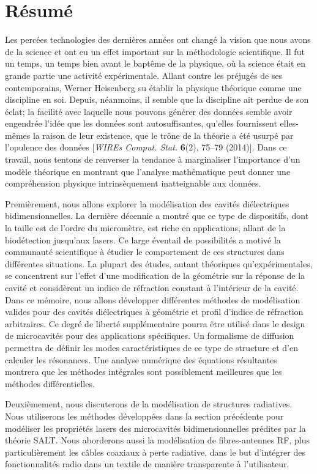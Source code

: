 \chapter*{Résumé}
Les percées technologies des dernières années ont changé
la vision que nous avons de la science et ont eu un effet 
important sur la méthodologie scientifique. Il fut un temps, un temps
bien avant le baptême de la physique, où la science était
en grande partie une activité expérimentale. Allant 
contre les préjugés de ses contemporains, Werner
Heisenberg su établir la physique théorique comme une
discipline en soi. Depuis, néanmoins, il semble que la
discipline ait perdue de son éclat; la facilité
avec laquelle nous pouvons générer des données semble avoir
engendrée l'idée que les données sont autosuffisantes, 
qu'elles fournissent elles-mêmes la raison de leur existence, 
que le trône de la théorie a été usurpé par l'opulence
des données [\textit{WIREs Comput. Stat.} \textbf{6}(2), 75--79 (2014)]. 
Dans ce travail, nous tentons de renverser
la tendance à marginaliser l'importance d'un modèle 
théorique en montrant que l'analyse mathématique peut donner une 
compréhension physique intrinsèquement inatteignable 
aux données. 

Premièrement, nous allons explorer la modélisation des
cavités diélectriques bidimensionnelles. La dernière
décennie a montré que ce type de dispositifs, dont la 
taille est de l'ordre du micromètre, est riche en applications, 
allant de la biodétection jusqu'aux lasers. Ce large éventail de
possibilités a motivé la communauté scientifique à étudier
le comportement de ces structures dans différentes situations.
La plupart des études, autant théoriques qu'expérimentales, 
se concentrent sur l'effet d'une modification de la géométrie 
sur la réponse de la cavité et considèrent un 
indice de réfraction constant à l'intérieur de la cavité. 
Dans ce mémoire, nous allons développer différentes méthodes
de modélisation valides pour des cavités diélectriques à géométrie et 
profil d'indice de réfraction arbitraires. Ce
degré de liberté supplémentaire pourra être utilisé
dans le design de microcavités pour des applications
spécifiques. 
Un formalisme de diffusion permettra de définir les modes caractéristiques
de ce type de structure et d'en calculer les résonances. Une analyse
numérique des équations résultantes montrera que les méthodes intégrales
sont possiblement meilleures que les méthodes différentielles.

Deuxièmement, nous discuterons de la modélisation de structures
radiatives. Nous utiliserons les méthodes développées dans la section
précédente pour modéliser les propriétés lasers des microcavités
bidimensionnelles prédites par la théorie SALT. Nous aborderons
aussi la modélisation de fibres-antennes RF, plus particulièrement
les câbles coaxiaux à perte radiative, dans le but d'intégrer
des fonctionnalités radio dans un textile de manière transparente
à l'utilisateur. 